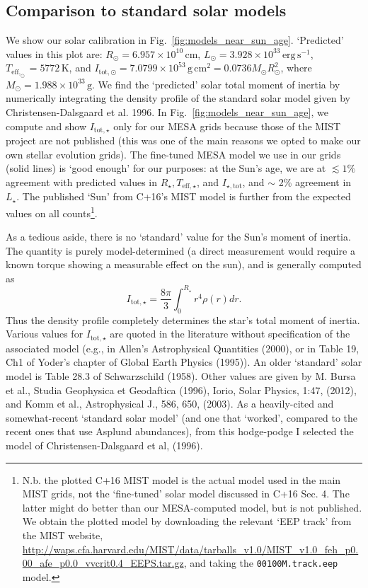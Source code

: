 \documentclass{article}
\begin{document}
\subsection{Comparison to standard solar models}
\label{sec:solar_calibration}
We show our solar calibration in Fig.~\ref{fig:models_near_sun_age}.
`Predicted' values in this plot are: $R_\odot = 
6.957\times10^{10}\,\mathrm{cm}$, $L_\odot = 
3.928\times10^{33}\,\mathrm{erg\,s^{-1}}$, $T_\mathrm{eff,_\odot} = 
5772\,\mathrm{K}$, and $I_\mathrm{tot,\odot} = 
7.0799\times10^{53}\,\mathrm{g\,cm^2} = 
0.0736 M_\odot R_\odot^2$, where $M_\odot = 1.988\times10^{33}\,\mathrm{g}$.
We find the `predicted' solar total moment of inertia by numerically 
integrating the density profile of the standard solar model given by 
Christensen-Dalsgaard et al. 1996.
In Fig.~\ref{fig:models_near_sun_age}, we compute and show 
$I_\mathrm{tot,\star}$ only for our MESA grids because those of the MIST 
project are not published (this was one of the main reasons we opted to make 
our own stellar evolution grids).
The fine-tuned MESA model we use in our grids (solid lines) is `good enough' 
for our purposes: at the Sun's age, we are at $\lesssim 1\%$ agreement with 
predicted values in $R_\star, T_\mathrm{eff,\star}$, and 
$I_\mathrm{\star,tot}$, and $\sim$ 2\% agreement in $L_\star$.
The published `Sun' from C+16's MIST model is further from the expected values 
on all counts\footnote{N.b. the plotted C+16 MIST model is the actual model 
used in the main MIST grids, not the `fine-tuned' solar model discussed in C+16 
Sec. 4. The latter might do better than our MESA-computed model, but is not 
published. We obtain the plotted model by downloading the relevant `EEP track' 
from the 
MIST website, 
\url{http://waps.cfa.harvard.edu/MIST/data/tarballs_v1.0/MIST_v1.0_feh_p0.00_afe_p0.0_vvcrit0.4_EEPS.tar.gz},
and taking the \texttt{00100M.track.eep} model.}.

As a tedious aside, there is no `standard' value for the Sun's moment of 
inertia. The quantity is purely model-determined (a direct measurement would 
require a known torque showing a measurable effect on the sun), and is 
generally computed as 
\begin{equation}
I_{\mathrm{tot,\star}} = \frac{8\pi}{3} \int_0^{R_\star} r^4 \rho(r) dr.
\end{equation}
Thus the density profile completely determines the star's total moment of 
inertia. Various values for $I_\mathrm{tot,\star}$ are quoted in the 
literature without specification of the associated model (e.g., in Allen's 
Astrophysical Quantities (2000), or in Table 19, Ch1 of Yoder's chapter of 
Global Earth Physics (1995)). An older `standard' solar model is Table 28.3 of 
Schwarzschild (1958). Other values are given by M. Bursa et al., Studia 
Geophysica et Geodaftica (1996), Iorio, Solar Physics, 1:47, (2012), and Komm 
et al., Astrophysical J., 586, 650, (2003).
As a heavily-cited and somewhat-recent `standard solar model' (and one that 
`worked', compared to the recent ones that use Asplund abundances), from this 
hodge-podge I selected the model of Christensen-Dalsgaard et al, (1996). 
\end{document}
